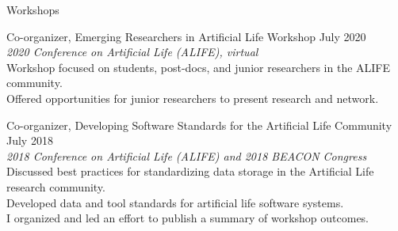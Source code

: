 \begin{rSection}{Workshops}


Co-organizer, Emerging Researchers in Artificial Life Workshop
\hfill July 2020 \\
\tab \textit{2020 Conference on Artificial Life (ALIFE), virtual} \\
\tab Workshop focused on students, post-docs, and junior researchers in the ALIFE community. \\
\tab Offered opportunities for junior researchers to present research and network.

Co-organizer, Developing Software Standards for the Artificial Life Community
\hfill July 2018 \\
\tab \textit{2018 Conference on Artificial Life (ALIFE) and 2018 BEACON Congress} \\
\tab Discussed best practices for standardizing data storage in the Artificial Life research community. \\
\tab Developed data and tool standards for artificial life software systems. \\
\tab I organized and led an effort to publish a summary of workshop outcomes.

\end{rSection}